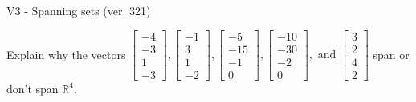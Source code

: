 \begin{exercise}
  \begin{exerciseTitle}V3 - Spanning sets (ver. 321)\end{exerciseTitle}
  \begin{exerciseStatement}
    Explain why the vectors \(\left[\begin{array}{r}
-4 \\
-3 \\
1 \\
-3
\end{array}\right] , \left[\begin{array}{r}
-1 \\
3 \\
1 \\
-2
\end{array}\right] , \left[\begin{array}{r}
-5 \\
-15 \\
-1 \\
0
\end{array}\right] , \left[\begin{array}{r}
-10 \\
-30 \\
-2 \\
0
\end{array}\right] , \text{ and } \left[\begin{array}{r}
3 \\
2 \\
4 \\
2
\end{array}\right]\) span or don't span \(\mathbb{R}^4\). 
	



\end{exerciseStatement}
\end{exercise}
